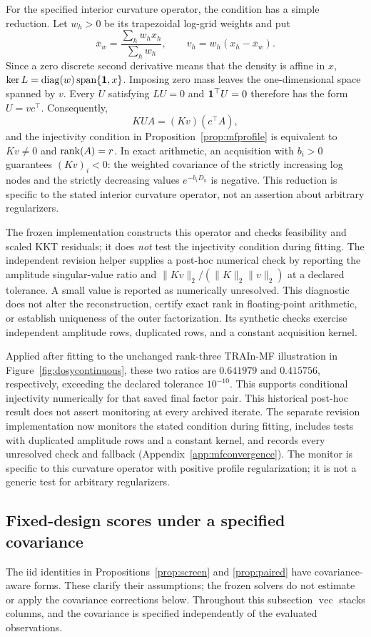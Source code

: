 For the specified interior curvature operator, the condition has a simple reduction. Let $w_h>0$ be its trapezoidal log-grid weights and put
\[
 \overline x_w=\frac{\sum_h w_hx_h}{\sum_h w_h},\qquad
 v_h=w_h(x_h-\overline x_w).
\]
Since a zero discrete second derivative means that the density is affine in $x$, $\ker L=\operatorname{diag}(w)\operatorname{span}\{\mathbf{1},x\}$. Imposing zero mass leaves the one-dimensional space spanned by $v$. Every $U$ satisfying $LU=0$ and $\mathbf{1}^\top U=0$ therefore has the form $U=vc^\top$. Consequently,
\[
 KUA=(Kv)(c^\top A),
\]
and the injectivity condition in Proposition~\ref{prop:mfprofile} is equivalent to $Kv\ne0$ and $\operatorname{rank}(A)=r$. In exact arithmetic, an acquisition with $b_i>0$ guarantees $(Kv)_i<0$: the weighted covariance of the strictly increasing log nodes and the strictly decreasing values $e^{-b_iD_h}$ is negative. This reduction is specific to the stated interior curvature operator, not an assertion about arbitrary regularizers.

The frozen implementation constructs this operator and checks feasibility and scaled KKT residuals; it does \emph{not} test the injectivity condition during fitting. The independent revision helper  supplies a post-hoc numerical check by reporting the amplitude singular-value ratio and $\|Kv\|_2/(\|K\|_2\|v\|_2)$ at a declared tolerance. A small value is reported as numerically unresolved. This diagnostic does not alter the reconstruction, certify exact rank in floating-point arithmetic, or establish uniqueness of the outer factorization. Its synthetic checks exercise independent amplitude rows, duplicated rows, and a constant acquisition kernel.

Applied after fitting to the unchanged rank-three TRAIn-MF illustration in Figure~\ref{fig:dosycontinuous}, these two ratios are $0.641979$ and $0.415756$, respectively, exceeding the declared tolerance $10^{-10}$. This supports conditional injectivity numerically for that saved final factor pair. This historical post-hoc result does not assert monitoring at every archived iterate. The separate revision implementation now monitors the stated condition during fitting, includes tests with duplicated amplitude rows and a constant kernel, and records every unresolved check and fallback (Appendix~\ref{app:mfconvergence}). The monitor is specific to this curvature operator with positive profile regularization; it is not a generic test for arbitrary regularizers.

\subsection{Fixed-design scores under a specified covariance}\label{app:covariance}
The iid identities in Propositions~\ref{prop:screen} and \ref{prop:paired} have covariance-aware forms. These clarify their assumptions; the frozen solvers do not estimate or apply the covariance corrections below. Throughout this subsection $\operatorname{vec}$ stacks columns, and the covariance is specified independently of the evaluated observations.

